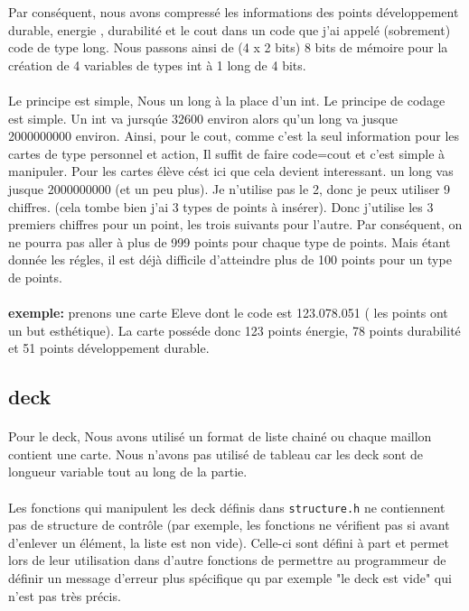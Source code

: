 \documentclass[12pt]{article}
\begin{document}
 Par conséquent, nous avons compressé les informations des points d\'eveloppement durable, energie , durabilit\'e et le cout dans un code que j'ai appel\'e (sobrement) code de type long. Nous passons ainsi de (4 x 2 bits) 8 bits  de mémoire pour la création de 4 variables de types int à 1 long de 4 bits.
 

\paragraph{}
Le principe est simple, Nous un long \` a la place d'un int.  Le principe de codage est simple. Un int va jursq\'ue 32600 environ alors qu'un long va jusque 2000000000 environ. Ainsi, pour le cout, comme c'est la seul information pour les cartes de type personnel et action, Il suffit de  faire code=cout et c'est simple \` a manipuler. Pour les cartes \'el\`eve c\' est ici que cela devient interessant. un  long vas jusque 2000000000 (et un peu plus). Je n'utilise pas le 2, donc je peux utiliser 9 chiffres. (cela tombe bien j'ai 3 types de points \`a ins\'erer). Donc j'utilise les 3 premiers chiffres pour un point, les trois suivants pour l'autre. Par cons\'equent, on ne pourra pas aller à plus de 999 points pour chaque type de points. Mais étant donnée les régles, il est déjà difficile d'atteindre plus de 100 points pour un type de points.

\paragraph{}
\textbf{exemple:} prenons une carte Eleve dont le code est 123.078.051 ( les points ont un but esthétique). La carte posséde donc  123 points énergie, 78 points durabilité et 51 points développement durable.

\subsection{deck}

\paragraph{}
Pour le deck, Nous avons utilis\'e un format de liste chain\'e ou chaque maillon contient une carte. Nous n'avons pas utilisé de tableau car les deck sont de longueur variable tout au long de la partie.

\paragraph{}
Les fonctions qui manipulent les deck définis dans \texttt{structure.h} ne contiennent pas de structure de contrôle (par exemple, les fonctions ne vérifient pas si avant d'enlever un élément, la liste est non vide). Celle-ci sont défini à part et permet lors de leur utilisation dans d'autre fonctions de permettre au programmeur de définir un message d'erreur plus spécifique qu par exemple "le deck est vide" qui n'est pas très précis.
\end{document}
